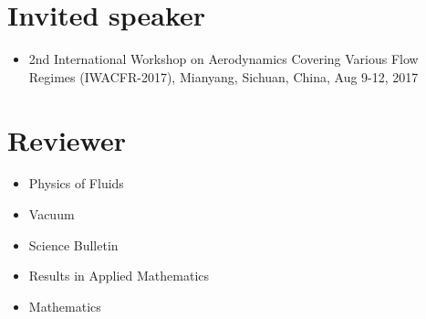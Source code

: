 \documentclass[11pt,a4paper,english]{moderncv}
\begin{document}
%



\section{Invited speaker}
\begin{itemize}
    \item 2nd International Workshop on Aerodynamics Covering Various Flow Regimes (IWACFR-2017),
        Mianyang, Sichuan, China, Aug 9-12, 2017
\end{itemize}

\section{Reviewer}
\begin{itemize}
    \item Physics of Fluids
    \item Vacuum
    \item Science Bulletin
    \item Results in Applied Mathematics
    \item Mathematics
\end{itemize}

\nocite{*}
\printbibliography
\end{document}

